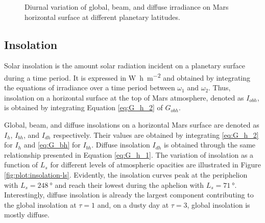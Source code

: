 \begin{figure}[H]
\begin{subfigure}[t]{\subfigureWidth}
  		\label{fig:sub:irradiance-phi-p40}
	   \end{subfigure}\hfill
	\caption{Diurnal variation of global, beam, and diffuse irradiance on Mars horizontal surface at different planetary latitudes.}
	\label{fig:plot:irradiances-phi}
\vspace{-2ex}
\end{figure}


\subsection{Insolation}
\label{sec:MartianEnvironment:SolarRadiation:Insolation}

Solar insolation is the amount solar radiation incident on a planetary surface during a time period. It is expressed in \si{\watt\hour\per\meter\squared} and obtained by integrating the equations of irradiance over a time period between $\omega_1$ and $\omega_2$. Thus, insolation on a horizontal surface at the top of Mars atmosphere, denoted as $I_{obh}$, is obtained by integrating Equation \ref{eq:G_h_2} of $G_{obh}$.

Global, beam, and diffuse insolations on a horizontal Mars surface are denoted as $I_{h}$, $I_{bh}$, and $I_{dh}$ respectively. Their values are obtained by integrating \ref{eq:G_h_2} for $I_{h}$ and \ref{eq:G_bh} for $I_{bh}$. Diffuse insolation $I_{dh}$ is obtained through the same relationship presented in Equation \ref{eq:G_h_1}. The variation of insolation as a function of $L_{s}$ for different levels of atmospheric opacities are illustrated in Figure \ref{fig:plot:insolation-ls}. Evidently, the insolation curves peak at the periphelion with $L_{s} = \SI{248}{\degree}$ and reach their lowest during the aphelion with $L_{s} = \SI{71}{\degree}$. Interestingly, diffuse insolation is already the largest component contributing to the global insolation at $\tau = 1$ and, on a dusty day at $\tau = 3$, global insolation is mostly diffuse.

